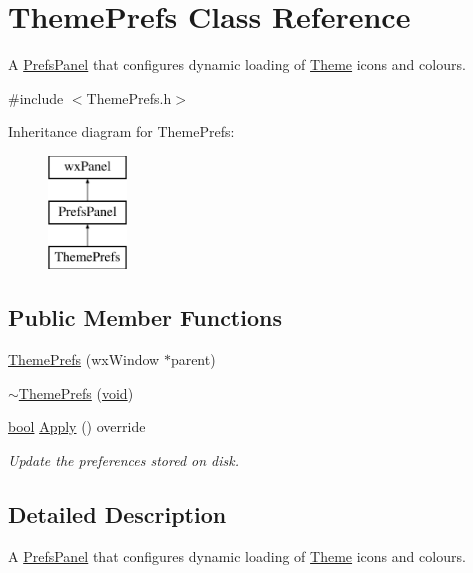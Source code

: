 \hypertarget{class_theme_prefs}{}\section{Theme\+Prefs Class Reference}
\label{class_theme_prefs}


A \hyperlink{class_prefs_panel}{Prefs\+Panel} that configures dynamic loading of \hyperlink{class_theme}{Theme} icons and colours.  




{\ttfamily \#include $<$Theme\+Prefs.\+h$>$}

Inheritance diagram for Theme\+Prefs\+:\begin{figure}[H]
\begin{center}
\leavevmode
\includegraphics[height=3.000000cm]{class_theme_prefs}
\end{center}
\end{figure}
\subsection*{Public Member Functions}
\begin{DoxyCompactItemize}
\item 
\hyperlink{class_theme_prefs_ac62d86ab3cafe9d4bc1fc96a54b85ddc}{Theme\+Prefs} (wx\+Window $\ast$parent)
\item 
\hyperlink{class_theme_prefs_a5afb22465dadb6d87d54656392a5ecc9}{$\sim$\+Theme\+Prefs} (\hyperlink{sound_8c_ae35f5844602719cf66324f4de2a658b3}{void})
\item 
\hyperlink{mac_2config_2i386_2lib-src_2libsoxr_2soxr-config_8h_abb452686968e48b67397da5f97445f5b}{bool} \hyperlink{class_theme_prefs_ae3f457af1e44c6f898575fb29ba9e89c}{Apply} () override
\begin{DoxyCompactList}\small\item\em Update the preferences stored on disk. \end{DoxyCompactList}\end{DoxyCompactItemize}


\subsection{Detailed Description}
A \hyperlink{class_prefs_panel}{Prefs\+Panel} that configures dynamic loading of \hyperlink{class_theme}{Theme} icons and colours. 

